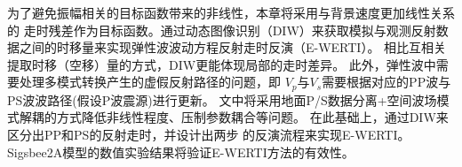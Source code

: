 为了避免振幅相关的目标函数带来的非线性，本章将采用与背景速度更加线性关系的
走时残差作为目标函数。通过动态图像识别（DIW）来获取模拟与观测反射数据之间的时移量\cite{ma2013}来实现弹性波波动方程反射走时反演（E-WERTI）。
相比互相关提取时移（空移）量的方式\cite{chi2015,Wang2015}，DIW更能体现局部的走时差异。
此外，弹性波中需要处理多模式转换产生的虚假反射路径的问题，即
$V_p$与$V_s$需要根据对应的PP波与PS波波路径(假设P波震源)进行更新。
文中将采用地面P/S数据分离+空间波场模式解耦的方式降低非线性程度、压制参数耦合等问题。
在此基础上，通过DIW来区分出PP和PS的反射走时，并设计出两步
的反演流程来实现E-WERTI。Sigsbee2A模型的数值实验结果将验证E-WERTI方法的有效性。
